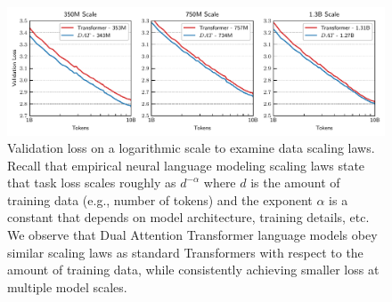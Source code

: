 \begin{figure}
    \includegraphics[width=\textwidth]{figs/experiments/fineweb/valloss_logtok.pdf}
    \caption{Validation loss on a logarithmic scale to examine data scaling laws. Recall that empirical neural language modeling scaling laws state that task loss scales roughly as $d^{-\alpha}$ where $d$ is the amount of training data (e.g., number of tokens) and the exponent $\alpha$ is a constant that depends on model architecture, training details, etc. We observe that Dual Attention Transformer language models obey similar scaling laws as standard Transformers with respect to the amount of training data, while consistently achieving smaller loss at multiple model scales.}
\end{figure}

